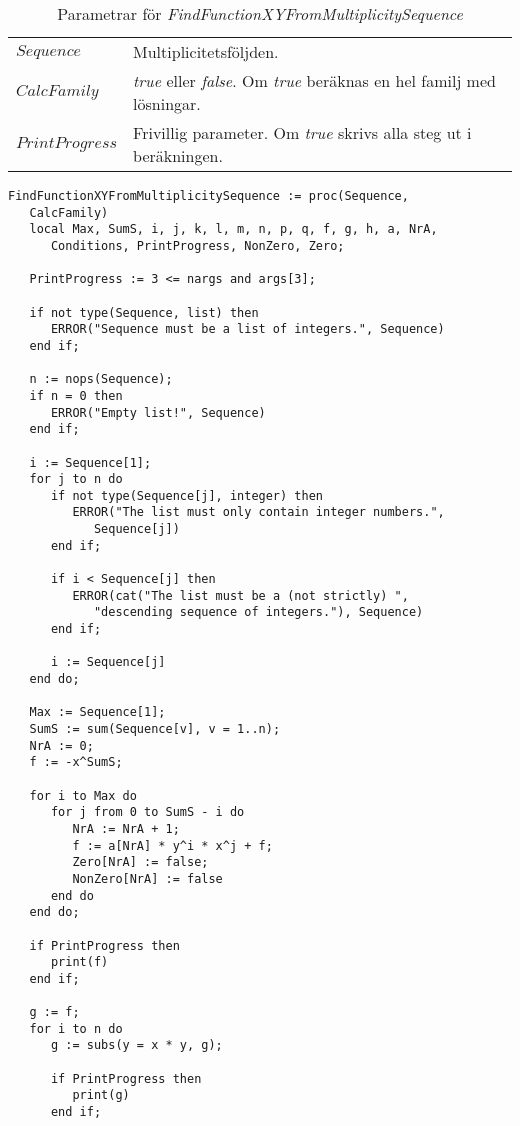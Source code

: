 \begin{table}[h]
\caption{Parametrar för \emph{FindFunctionXYFromMultiplicitySequence}}
\begin{center}
\begin{tabular}{|l|p{9cm}|}
\hline
$Sequence$ & Multiplicitetsföljden.\\
$CalcFamily$ & \emph{true} eller \emph{false}. Om \emph{true} beräknas en hel familj med lösningar.\\
$PrintProgress$ & Frivillig parameter. Om \emph{true} skrivs alla steg ut i beräkningen.\\
\hline
\end{tabular}
\end{center}
\end{table}

\begin{verbatim}
FindFunctionXYFromMultiplicitySequence := proc(Sequence, 
   CalcFamily)
   local Max, SumS, i, j, k, l, m, n, p, q, f, g, h, a, NrA, 
      Conditions, PrintProgress, NonZero, Zero;

   PrintProgress := 3 <= nargs and args[3];

   if not type(Sequence, list) then
      ERROR("Sequence must be a list of integers.", Sequence)
   end if;

   n := nops(Sequence);
   if n = 0 then
      ERROR("Empty list!", Sequence)
   end if;

   i := Sequence[1];
   for j to n do
      if not type(Sequence[j], integer) then
         ERROR("The list must only contain integer numbers.", 
            Sequence[j])
      end if;

      if i < Sequence[j] then
         ERROR(cat("The list must be a (not strictly) ",
            "descending sequence of integers."), Sequence)
      end if;

      i := Sequence[j]
   end do;

   Max := Sequence[1];
   SumS := sum(Sequence[v], v = 1..n);
   NrA := 0;
   f := -x^SumS;

   for i to Max do
      for j from 0 to SumS - i do
         NrA := NrA + 1;
         f := a[NrA] * y^i * x^j + f;
         Zero[NrA] := false;
         NonZero[NrA] := false
      end do
   end do;

   if PrintProgress then
      print(f)
   end if;

   g := f;
   for i to n do
      g := subs(y = x * y, g);

      if PrintProgress then
         print(g)
      end if;


\end{verbatim}
